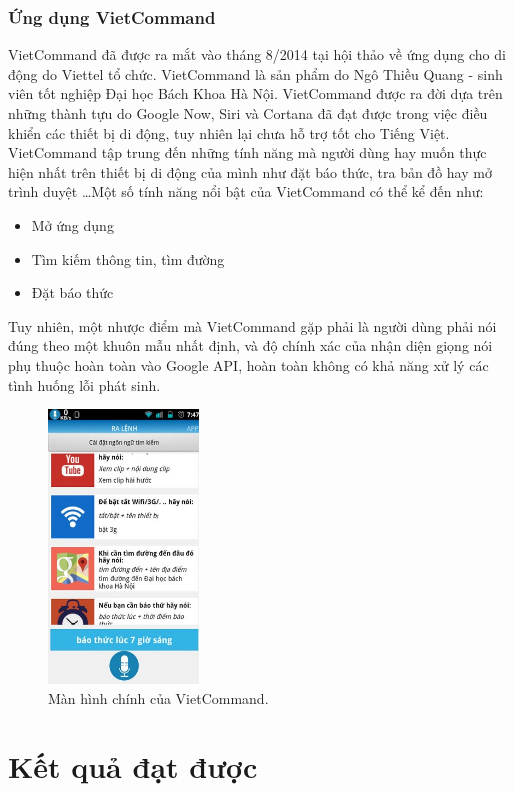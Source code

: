 \documentclass[12pt]{report}
\begin{document}
\subsection{Ứng dụng VietCommand}

VietCommand đã được ra mắt vào tháng 8/2014 tại hội thảo về ứng dụng cho di động do Viettel tổ chức. VietCommand là sản phẩm do Ngô Thiều Quang - sinh viên tốt nghiệp Đại học Bách Khoa Hà Nội. VietCommand được ra đời dựa trên những thành tựu do Google Now, Siri và Cortana đã đạt được trong việc điều khiển các thiết bị di động, tuy nhiên lại chưa hỗ trợ tốt cho Tiếng Việt. VietCommand tập trung đến những tính năng mà người dùng hay muốn thực hiện nhất trên thiết bị di động của mình như đặt báo thức, tra bản đồ hay mở trình duyệt \ldots Một số tính năng nổi bật của VietCommand có thể kể đến như:

\begin{itemize}
	\item Mở ứng dụng
	\item Tìm kiếm thông tin, tìm đường
	\item Đặt báo thức
\end{itemize}

Tuy nhiên, một nhược điểm mà VietCommand gặp phải là người dùng phải nói đúng theo một khuôn mẫu nhất định, và độ chính xác của nhận diện giọng nói phụ thuộc hoàn toàn vào Google API, hoàn toàn không có khả năng xử lý các tình huống lỗi phát sinh.

\begin{figure}[H]
	\centering
	\includegraphics[width=4cm]{Pics/Chap5/vietcommand.jpg}
	\caption{Màn hình chính của VietCommand.}
\end{figure}
\chapter{Kết quả đạt được}
\end{document}
